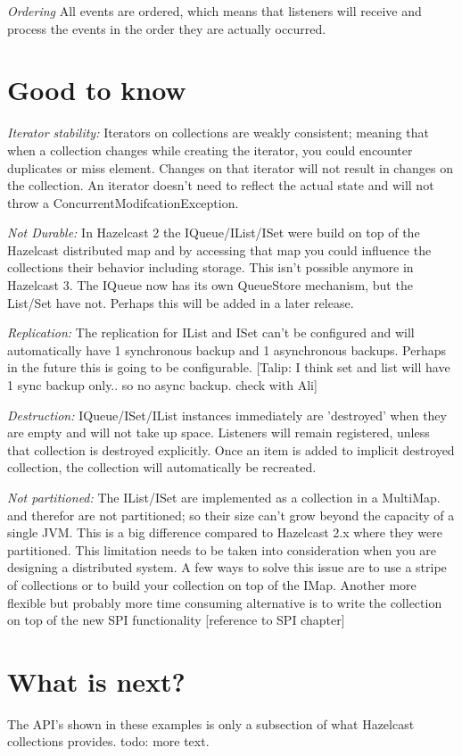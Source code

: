 \emph{Ordering} All events are ordered, which means that listeners will receive and process the events in the order they are actually occurred. 

\section{Good to know}

\emph{Iterator stability:} Iterators on collections are weakly consistent; meaning that when a collection changes while creating the iterator, you could encounter duplicates or miss element. Changes on that iterator will not result in changes on the collection. An iterator doesn't need to reflect the actual state and will not throw a ConcurrentModifcationException. 

\emph{Not Durable:} In Hazelcast 2 the IQueue/IList/ISet were build on top of the Hazelcast distributed map and by accessing that map you could influence the collections their behavior including storage. This isn't possible anymore in Hazelcast 3. The IQueue now has its own QueueStore mechanism, but the List/Set have not. Perhaps this will be added in a later release.

\emph{Replication:} The replication for IList and ISet can't be configured and will automatically have 1 synchronous backup and 1 asynchronous backups. Perhaps in the future this is going to be configurable.
[Talip: I think set and list will have 1 sync backup only.. so no async backup. check with Ali]


\emph{Destruction:} IQueue/ISet/IList instances immediately are 'destroyed' when they are empty and will not take up space. Listeners will remain registered, unless that collection is destroyed explicitly. Once an item is added to implicit destroyed collection, the collection will automatically be recreated.

\emph{Not partitioned:}  The IList/ISet are implemented as a collection in a MultiMap. and therefor are not partitioned; so their size can't grow beyond the capacity of a single JVM. This is a big difference compared to Hazelcast 2.x where they were partitioned. This limitation needs to be taken into consideration when you are designing a distributed system. A few ways to solve this issue are to use a stripe of collections or to build your collection on top of the IMap. Another more flexible but probably more time consuming alternative is to write the collection on top of the new SPI functionality [reference to SPI chapter]

\section{What is next?}
The API's shown in these examples is only a subsection of what Hazelcast collections provides. todo: more text.